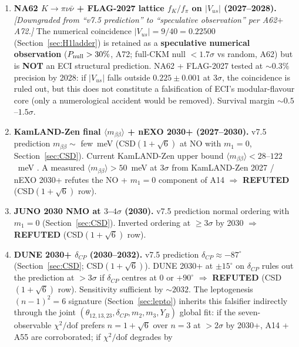 \documentclass[a4paper,11pt]{article}
\theoremstyle{definition}
\theoremstyle{remark}
\begin{document}
\begin{enumerate}
  \item \textbf{NA62 $K\to\pi\nu\bar\nu$ + FLAG-2027 lattice
    $f_K/f_\pi$ on $|V_{us}|$ (2027--2028).}
    \emph{[Downgraded from ``v7.5 prediction'' to ``speculative
    observation'' per A62$+$A72.]}
    The numerical coincidence $|V_{us}|=9/40=0.22500$
    (Section~\ref{sec:H1ladder}) is retained as a
    \textbf{speculative numerical observation} ($P_{\rm null}>30\%$,
    A72; full-CKM null $<1.7\sigma$ vs random, A62) but is
    \textbf{NOT} an ECI structural prediction.  NA62 + FLAG-2027
    tested at $\sim 0.3\%$ precision by 2028: if $|V_{us}|$ falls
    outside $0.225\pm 0.001$ at $3\sigma$, the coincidence is
    ruled out, but this does not constitute a falsification of
    ECI's modular-flavour core (only a numerological accident
    would be removed).  Survival margin $\sim 0.5$--$1.5\sigma$.
  \item \textbf{KamLAND-Zen final $\langle m_{\beta\beta}\rangle$
    + nEXO 2030+ (2027--2030).}  v7.5 prediction
    $m_{\beta\beta}\sim$ few~meV (CSD$(1+\sqrt 6)$ at NO with
    $m_1=0$, Section~\ref{sec:CSD}).  Current KamLAND-Zen
    upper bound $\langle m_{\beta\beta}\rangle < 28$--$122$~meV
    \cite{KZ24}.  A measured $\langle m_{\beta\beta}\rangle
    > 50$~meV at $3\sigma$ from KamLAND-Zen 2027 / nEXO 2030+
    refutes the NO + $m_1=0$ component of A14
    $\Rightarrow$ \textbf{REFUTED} (CSD$(1+\sqrt 6)$ row).
  \item \textbf{JUNO 2030 NMO at $3$--$4\sigma$ (2030).}  v7.5
    prediction normal ordering with $m_1=0$
    (Section~\ref{sec:CSD}).  Inverted ordering at $\geq 3\sigma$
    by 2030 \cite{JUNO22} $\Rightarrow$ \textbf{REFUTED}
    (CSD$(1+\sqrt 6)$ row).
  \item \textbf{DUNE 2030+ $\delta_{CP}$ (2030--2032).}  v7.5
    prediction $\delta_{CP}\approx -87^{\circ}$
    (Section~\ref{sec:CSD}; CSD$(1+\sqrt 6)$).  DUNE 2030+ at
    $\pm 15^{\circ}$ \cite{DUNE24} on $\delta_{CP}$ rules out
    the prediction at $>3\sigma$ if $\delta_{CP}$ centres at
    $0$ or $+90^{\circ}$ $\Rightarrow$ \textbf{REFUTED}
    (CSD$(1+\sqrt 6)$ row).  Sensitivity sufficient by
    $\sim 2032$.  The leptogenesis $(n-1)^2=6$ signature
    (Section~\ref{sec:lepto}) inherits this falsifier indirectly
    through the joint
    $(\theta_{12,13,23},\delta_{CP},m_2,m_3,Y_B)$ global fit:
    if the seven-observable $\chi^2/\mathrm{dof}$ prefers
    $n=1+\sqrt 6$ over $n=3$ at $>2\sigma$ by 2030+, A14 +
    A55 are corroborated; if $\chi^2/\mathrm{dof}$ degrades by

\end{enumerate}
\end{document}
